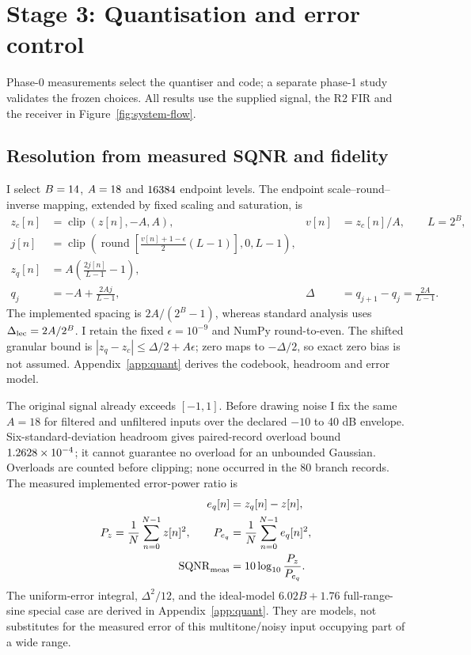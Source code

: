 \FloatBarrier
\section{Stage 3: Quantisation and error control}
Phase-0 measurements select the quantiser and code; a separate phase-1
study validates the frozen choices. All results use the supplied signal,
the R2 FIR and the receiver in Figure~\ref{fig:system-flow}.
\subsection{Resolution from measured SQNR and fidelity}
\label{sec:r31}
I select $ B=14 $, $ A=18 $ and $16384 $ endpoint levels.
The endpoint scale--round--inverse mapping, extended by fixed scaling
and saturation, is 
\begin{align}
 z_c[n]&=\operatorname{clip}(z[n],-A,A),&
 v[n]&=z_c[n]/A,\qquad L=2^B,\\
 j[n]&=\operatorname{clip}\!\left(
 \operatorname{round}\!\left[\frac{v[n]+1-\epsilon}{2}(L-1)\right],
 0,L-1\right),\\
 z_q[n]&=A\left(\frac{2j[n]}{L-1}-1\right),
 \label{eq:r31mapping}\\
 q_j&=-A+\frac{2Aj}{L-1},&
 \Delta&=q_{j+1}-q_j=\frac{2A}{L-1}.
 \label{eq:r31spacing}
\end{align}
The implemented spacing is $2A/(2^B-1)$, whereas standard analysis uses
$\Delta_{\rm lec}=2A/2^B $.
I retain the fixed $\epsilon=10^{-9}$ and NumPy round-to-even.
The shifted granular bound is $|z_q-z_c|\le\Delta/2+A\epsilon $;
zero maps to $-\Delta/2 $, so exact zero bias is not assumed.
Appendix~\ref{app:quant} derives the codebook, headroom and error model.

The original signal already exceeds $[-1,1]$. Before drawing noise I fix
the same $ A=18 $ for filtered and unfiltered inputs over the declared
$-10 $ to 40 dB envelope. Six-standard-deviation headroom gives paired-record
overload bound $1.2628\times10^{-4} $; it cannot guarantee no overload for an
unbounded Gaussian. Overloads are counted before clipping; none occurred
in the 80 branch records.
The measured implemented error-power ratio is
\begin{align}
 e_q[n]&=z_q[n]-z[n],\\
 P_z=\frac1N\sum_{n=0}^{N-1}z[n]^2,\qquad
 P_{e_q}&=\frac1N\sum_{n=0}^{N-1}e_q[n]^2,\\
 {\rm SQNR}_{\rm meas}&=10\log_{10}\frac{P_z}{P_{e_q}}.
 \label{eq:r31sqnr}
\end{align}
The uniform-error integral, $\Delta^2/12 $, and the ideal-model
$6.02B+1.76 $ full-range-sine special case are derived in
Appendix~\ref{app:quant}. They are models, not substitutes for the
measured error of this multitone/noisy input occupying part of a wide range.

